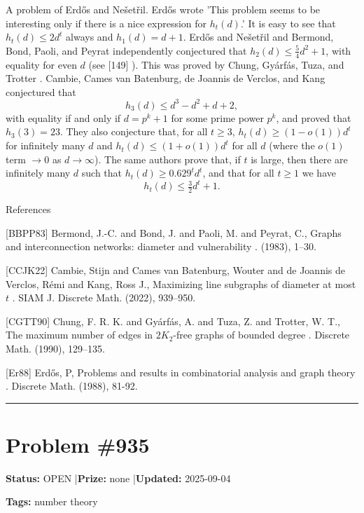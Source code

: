 \documentclass{article}
\begin{document}
A problem of Erd\H{o}s and Ne\v{s}et\v{r}il. Erd\H{o}s \cite{Er88} wrote 'This problem seems to be interesting only if there is a nice expression for $h_t(d)$.' It is easy to see that $h_t(d)\leq 2d^t$ always and $h_1(d)=d+1$. Erd\H{o}s and Ne\v{s}et\v{r}il and Bermond, Bond, Paoli, and Peyrat \cite{BBPP83} independently conjectured that $h_2(d) \leq \tfrac{5}{4}d^2+1$, with equality for even $d$ (see [149] ). This was proved by Chung, Gy\'{a}rf\'{a}s, Tuza, and Trotter \cite{CGTT90}. Cambie, Cames van Batenburg, de Joannis de Verclos, and Kang \cite{CCJK22} conjectured that\[h_3(d) \leq d^3-d^2+d+2,\]with equality if and only if $d=p^k+1$ for some prime power $p^k$, and proved that $h_3(3)=23$. They also conjecture that, for all $t\geq 3$, $h_t(d)\geq (1-o(1))d^t$ for infinitely many $d$ and $h_t(d)\leq (1+o(1))d^t$ for all $d$ (where the $o(1)$ term $\to 0$ as $d\to \infty$). The same authors prove that, if $t$ is large, then there are infinitely many $d$ such that $h_t(d) \geq 0.629^td^t$, and that for all $t\geq 1$ we have\[h_t(d) \leq \tfrac{3}{2}d^t+1.\]




References

[BBPP83] Bermond, J.-C. and Bond, J. and Paoli, M. and Peyrat, C., Graphs and interconnection networks: diameter and vulnerability . (1983), 1--30.

[CCJK22] Cambie, Stijn and Cames van Batenburg, Wouter and de Joannis de Verclos, R\'{e}mi and Kang, Ross J., Maximizing line subgraphs of diameter at most {$t$} . SIAM J. Discrete Math. (2022), 939--950.

[CGTT90] Chung, F. R. K. and Gy\'{a}rf\'{a}s, A. and Tuza, Z. and Trotter, W. T., The maximum number of edges in {$2K_2$}-free graphs of bounded degree . Discrete Math. (1990), 129--135.

[Er88] Erd\H{o}s, P, Problems and results in combinatorial analysis and graph theory . Discrete Math. (1988), 81-92.

\noindent\rule{\linewidth}{0.4pt}


\section{Problem \#935}
\label{prob:935}

\noindent\textbf{Status:} OPEN \quad|\quad \textbf{Prize:} none \quad|\quad \textbf{Updated:} 2025-09-04

\noindent\textbf{Tags:} number theory
\end{document}
